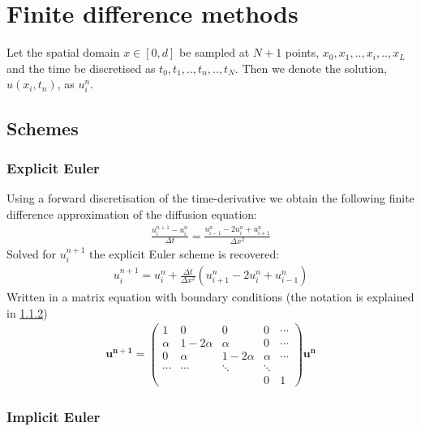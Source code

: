 \documentclass[11pt,a4paper,draft]{article}
\numberwithin{equation}{section}
\begin{document}
\section{Finite difference methods}

Let the spatial domain $x \in [0,d]$ be sampled at $N+1$ points, $x_0,x_1,..,x_i,..,x_L$ and the time be discretised as $t_0,t_1,..,t_n,..,t_N$. Then we denote the solution, $u(x_i,t_n)$, as $u_i^n$.  

\subsection{Schemes}

\subsubsection{Explicit Euler}
Using a forward discretisation of the time-derivative we obtain the following finite difference approximation of the diffusion equation:
\begin{align}
\frac{u_{i}^{n+1}-u_{i}^{n}}{\Delta t} = \frac{u_{i-1}^{n}-2u_{i}^{n}+u_{i+1}^{n}}{\Delta x^2}
\end{align}
Solved for $u_{i}^{n+1}$ the explicit Euler scheme is recovered:
\begin{gather}
u_i^{n+1} = u_i^n + \frac{\Delta t}{\Delta x^2}\left(
u_{i+1}^n - 2u_i^n + u_{i-1}^n
\right)
\end{gather}
Written in a matrix equation with boundary conditions (the notation 
is explained in \ref{subsubsec:implicit_euler})
\begin{gather}
\mathbf{u^{n+1}} = 
\begin{pmatrix}
1 & 0 & 0 & 0 & \cdots\\
\alpha & 1 - 2\alpha & \alpha & 0 & \cdots\\
0 & \alpha & 1-2\alpha & \alpha & \cdots\\
\cdots & \cdots & \ddots & \ddots& \\
&&& 0 & 1
\end{pmatrix} \mathbf{u^n}
\end{gather}


\subsubsection{Implicit Euler}
\label{subsubsec:implicit_euler}
\end{document}
